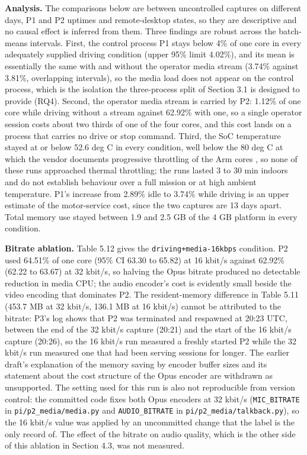 \textbf{Analysis.} The comparisons below are between uncontrolled captures on different days, P1 and P2 uptimes and remote-desktop states, so they are descriptive and no causal effect is inferred from them. Three findings are robust across the batch-means intervals. First, the control process P1 stays below 4\% of one core in every adequately supplied driving condition (upper 95\% limit 4.02\%), and its mean is essentially the same with and without the operator media stream (3.74\% against 3.81\%, overlapping intervals), so the media load does not appear on the control process, which is the isolation the three-process split of Section 3.1 is designed to provide (RQ4). Second, the operator media stream is carried by P2: 1.12\% of one core while driving without a stream against 62.92\% with one, so a single operator session costs about two thirds of one of the four cores, and this cost lands on a process that carries no drive or stop command. Third, the SoC temperature stayed at or below 52.6 deg C in every condition, well below the 80 deg C at which the vendor documents progressive throttling of the Arm cores \cite{rpi_docs}, so none of these runs approached thermal throttling; the runs lasted 3 to 30 min indoors and do not establish behaviour over a full mission or at high ambient temperature. P1's increase from 2.89\% idle to 3.74\% while driving is an upper estimate of the motor-service cost, since the two captures are 13 days apart. Total memory use stayed between 1.9 and 2.5 GB of the 4 GB platform in every condition.

\textbf{Bitrate ablation.} Table 5.12 gives the \texttt{driving+media-16kbps} condition. P2 used 64.51\% of one core (95\% CI 63.30 to 65.82) at 16 kbit/s against 62.92\% (62.22 to 63.67) at 32 kbit/s, so halving the Opus bitrate produced no detectable reduction in media CPU; the audio encoder's cost is evidently small beside the video encoding that dominates P2. The resident-memory difference in Table 5.11 (453.7 MB at 32 kbit/s, 136.1 MB at 16 kbit/s) cannot be attributed to the bitrate: P3's log shows that P2 was terminated and respawned at 20:23 UTC, between the end of the 32 kbit/s capture (20:21) and the start of the 16 kbit/s capture (20:26), so the 16 kbit/s run measured a freshly started P2 while the 32 kbit/s run measured one that had been serving sessions for longer. The earlier draft's explanation of the memory saving by encoder buffer sizes and its statement about the cost structure of the Opus encoder are withdrawn as unsupported. The setting used for this run is also not reproducible from version control: the committed code fixes both Opus encoders at 32 kbit/s (\texttt{MIC\_BITRATE} in \texttt{pi/p2\_media/media.py} and \texttt{AUDIO\_BITRATE} in \texttt{pi/p2\_media/talkback.py}), so the 16 kbit/s value was applied by an uncommitted change that the label is the only record of. The effect of the bitrate on audio quality, which is the other side of this ablation in Section 4.3, was not measured.

